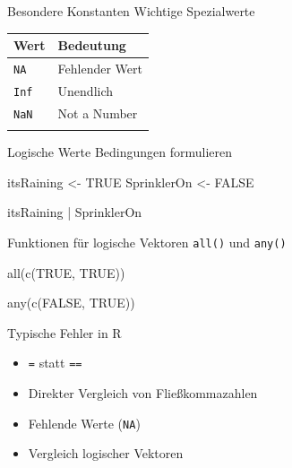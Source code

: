 \documentclass[
  10pt,
  ignorenonframetext,
  aspectratio=169,
]{beamer}
\newenvironment{Shaded}{}{}
\newcommand{\ConstantTok}[1]{\textcolor[rgb]{0.53,0.00,0.00}{#1}}
\newcommand{\FunctionTok}[1]{\textcolor[rgb]{0.02,0.16,0.49}{#1}}
\newcommand{\NormalTok}[1]{#1}
\newcommand{\OtherTok}[1]{\textcolor[rgb]{0.00,0.44,0.13}{#1}}
\newcommand{\SpecialCharTok}[1]{\textcolor[rgb]{0.25,0.44,0.63}{#1}}
\providecommand{\tightlist}{%
  \setlength{\itemsep}{0pt}\setlength{\parskip}{0pt}}
\begin{document}
\begin{frame}[fragile]{Besondere Konstanten}
\label{besondere-konstanten}
Wichtige Spezialwerte

\begin{longtable}[]{@{}ll@{}}
\toprule\noalign{}
Wert & Bedeutung \\
\midrule\noalign{}
\endhead
\texttt{NA} & Fehlender Wert \\
\texttt{Inf} & Unendlich \\
\texttt{NaN} & Not a Number \\
\bottomrule\noalign{}
\end{longtable}
\end{frame}

\begin{frame}[fragile]{Logische Werte}
\label{logische-werte}
Bedingungen formulieren

\begin{Shaded}
\begin{Highlighting}[]
\NormalTok{itsRaining }\OtherTok{\textless{}{-}} \ConstantTok{TRUE}
\NormalTok{SprinklerOn }\OtherTok{\textless{}{-}} \ConstantTok{FALSE}

\NormalTok{itsRaining }\SpecialCharTok{|}\NormalTok{ SprinklerOn}
\end{Highlighting}
\end{Shaded}
\end{frame}

\begin{frame}[fragile]{Funktionen für logische Vektoren}
\label{funktionen-fuxfcr-logische-vektoren}
\texttt{all()} und \texttt{any()}

\begin{Shaded}
\begin{Highlighting}[]
\FunctionTok{all}\NormalTok{(}\FunctionTok{c}\NormalTok{(}\ConstantTok{TRUE}\NormalTok{, }\ConstantTok{TRUE}\NormalTok{))}
\end{Highlighting}
\end{Shaded}

\begin{Shaded}
\begin{Highlighting}[]
\FunctionTok{any}\NormalTok{(}\FunctionTok{c}\NormalTok{(}\ConstantTok{FALSE}\NormalTok{, }\ConstantTok{TRUE}\NormalTok{))}
\end{Highlighting}
\end{Shaded}
\end{frame}

\begin{frame}[fragile]{Typische Fehler in R}
\label{typische-fehler-in-r}
\begin{itemize}
\tightlist
\item
  \texttt{=} statt \texttt{==}
\item
  Direkter Vergleich von Fließkommazahlen
\item
  Fehlende Werte (\texttt{NA})
\item
  Vergleich logischer Vektoren
\end{itemize}
\end{frame}
\end{document}
